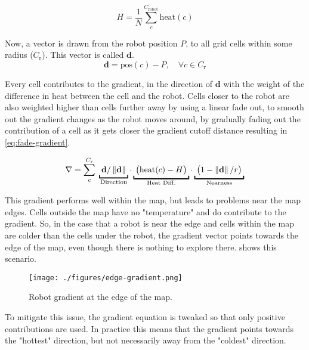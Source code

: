 \begin{equation}
\label{eq:robot-heat}
    H = \frac{1}{N} \sum_c^{C_\mathrm{robot}} \mathrm{heat}(c)
\end{equation}

Now, a vector is drawn from the robot position $P$, to all grid cells within some radius ($C_\mathrm{r}$). This vector is called $\mathbf{d}$.
\begin{equation}
    \mathbf{d} = \mathrm{pos}(c) - P, \quad \forall c \in C_\mathrm{r}
\end{equation}

Every cell contributes to the gradient, in the direction of $\mathbf{d}$ with the weight of the difference in heat between the cell and the robot. Cells closer to the robot are also weighted higher than cells further away by using a linear fade out, to smooth out the gradient changes as the robot moves around, by gradually fading out the contribution of a cell as it gets closer the gradient cutoff distance resulting in \cref{eq:fade-gradient}.

\begin{equation}
    \nabla = \sum_c^{C_\mathrm{r}} \;
    \underbracket{\; \mathbf{d}/\norm{\mathbf{d}}      \;}_\text{\makebox[0pt]{Direction}} \cdot
    \underbracket{\; \big(\mathrm{heat}(c) - H\big)    \;}_\text{Heat Diff.} \cdot
    \underbracket{\; \big(1 - \norm{\mathbf{d}}/r\big) \;}_\text{Nearness}
    \label{eq:fade-gradient}
\end{equation}

This gradient performs well within the map, but leads to problems near the map edges. Cells outside the map have no "temperature" and do contribute to the gradient. {\color{red}So}, in the case that a robot is near the edge and cells within the map are colder than the cells under the robot, the gradient vector points towards the edge of the map, even though there is nothing to explore there.  shows this scenario.

\begin{figure}[h]
    \begin{center}
        \texttt{[image: ./figures/edge-gradient.png]}
    \end{center}
    \caption{Robot gradient at the edge of the map.}
    \label{fig:edge-gradient}
\end{figure}

To mitigate this issue, the gradient equation is tweaked so that only positive contributions are used. In practice this means that the gradient points towards the "hottest" direction, but not necessarily away from the "coldest" direction.

